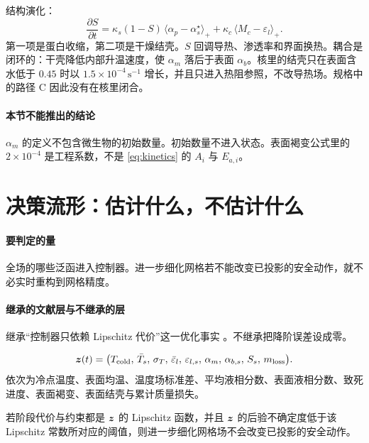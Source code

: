 结构演化：
\begin{equation}
\label{eq:structure}
\frac{\partial S}{\partial t}
=\kappa_s(1-S)\,\langle\alpha_p-\alpha_s^\star\rangle_+
+\kappa_c\,\langle M_{c}- \varepsilon_l\rangle_+.
\end{equation}
第一项是蛋白收缩，第二项是干燥结壳。\(S\) 回调导热、渗透率和界面换热。耦合是闭环的：干壳降低内部升温速度，使 \(\alpha_m\) 落后于表面 \(\alpha_b\)。核里的结壳只在表面含水低于 \(0.45\) 时以 \(1.5\times 10^{-4}\,\mathrm{s}^{-1}\) 增长，并且只进入热阻参照，不改导热场。规格中的路径 C 因此没有在核里闭合。

\paragraph{本节不能推出的结论}
\(\alpha_m\) 的定义不包含微生物的初始数量。初始数量不进入状态。表面褐变公式里的 \(2\times 10^{-4}\) 是工程系数，不是 \eqref{eq:kinetics} 的 \(A_i\) 与 \(E_{a,i}\)。

\section{决策流形：估计什么，不估计什么}

\paragraph{要判定的量}
全场的哪些泛函进入控制器。进一步细化网格若不能改变已投影的安全动作，就不必实时重构到网格精度。

\paragraph{继承的文献层与不继承的层}
继承“控制器只依赖 Lipschitz 代价”这一优化事实 \cite{rawlings2017}。不继承把降阶误差设成零。

\begin{definition}[决策状态]
\label{def:decision}
\begin{equation}
\label{eq:z}
\bm{z}(t)=\big(
T_{\mathrm{cold}},\,
\bar T_s,\,
\sigma_T,\,
\bar\varepsilon_l,\,
\varepsilon_{l,s},\,
\alpha_m,\,
\alpha_{b,s},\,
S_s,\,
m_{\mathrm{loss}}
\big).
\end{equation}
依次为冷点温度、表面均温、温度场标准差、平均液相分数、表面液相分数、致死进度、表面褐变、表面结壳与累计质量损失。
\end{definition}

\begin{proposition}[决策充分性]
若阶段代价与约束都是 \(\bm{z}\) 的 Lipschitz 函数，并且 \(\bm{z}\) 的后验不确定度低于该 Lipschitz 常数所对应的阈值，则进一步细化网格场不会改变已投影的安全动作。
\end{proposition}

